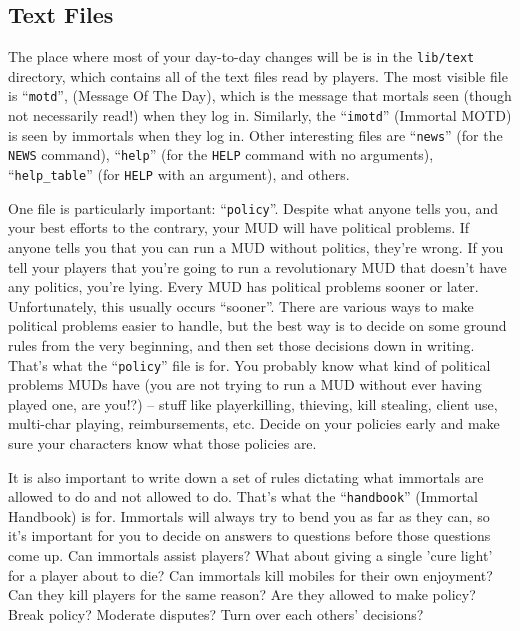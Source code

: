 \documentclass[11pt]{article}
\begin{document}
\subsection{Text Files}
The place where most of your day-to-day changes will be is in the \texttt{lib/text} directory, which contains all of the text files read by players.  The most visible file is ``\texttt{motd}'', (Message Of The Day), which is the message that mortals seen (though not necessarily read!) when they log in. Similarly, the ``\texttt{imotd}'' (Immortal MOTD) is seen by immortals when they log in.  Other interesting files are ``\texttt{news}'' (for the \texttt{NEWS} command), ``\texttt{help}'' (for the \texttt{HELP} command with no arguments), ``\texttt{help\_table}'' (for \texttt{HELP} with an argument), and others.
\par
One file is particularly important: ``\texttt{policy}''.  Despite what anyone tells you, and your best efforts to the contrary, your MUD will have political problems.  If anyone tells you that you can run a MUD without politics, they're wrong.  If you tell your players that you're going to run a revolutionary MUD that doesn't have any politics, you're lying.  Every MUD has political problems sooner or later. Unfortunately, this usually occurs ``sooner''.  There are various ways to make political problems easier to handle, but the best way is to decide on some ground rules from the very beginning, and then set those decisions down in writing.  That's what the ``\texttt{policy}'' file is for.  You probably know what kind of political problems MUDs have (you are not trying to run a MUD without ever having played one, are you!?) -- stuff like playerkilling, thieving, kill stealing, client use, multi-char playing, reimbursements, etc.  Decide on your policies early and make sure your characters know what those policies are.
\par
It is also important to write down a set of rules dictating what immortals are allowed to do and not allowed to do.  That's what the ``\texttt{handbook}'' (Immortal Handbook) is for.  Immortals will always try to bend you as far as they can, so it's important for you to decide on answers to questions before those questions come up.  Can immortals assist players?  What about giving a single 'cure light' for a player about to die?  Can immortals kill mobiles for their own enjoyment?  Can they kill players for the same reason?  Are they allowed to make policy?  Break policy?  Moderate disputes?  Turn over each others' decisions?
\end{document}
